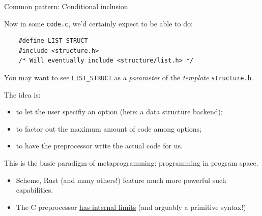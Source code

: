 \begin{frame}[fragile]{Common pattern: Conditional inclusion}

  Now in some \lstinline{code.c}, we'd certainly expect to be able to do:
  
  \begin{lstlisting}
    #define LIST_STRUCT
    #include <structure.h>
    /* Will eventually include <structure/list.h> */
  \end{lstlisting}

  You may want to see \lstinline{LIST_STRUCT} as a {\em parameter} of the {\em template} \lstinline{structure.h}.

  The idea is:
  \begin{itemize}
  \item to let the user specifiy an option (here: a data structure backend);
  \item to factor out the maximum amount of code among options;
  \item to have the preprocessor write the actual code for us.
  \end{itemize}

  This is the basic paradigm of metaprogramming: programming in program space.
  \begin{itemize}
  \item Scheme, Rust (and many others!) feature much more powerful such capabilities.
  \item The C preprocessor \href{https://github.com/pfultz2/Cloak/wiki/Is-the-C-preprocessor-Turing-complete\%3F}{has internal limits} (and arguably a primitive syntax!)
  \end{itemize}
  
\end{frame}

